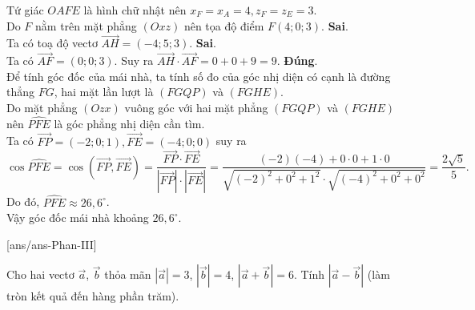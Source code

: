 \begin{ex}
{\begin{itemchoice}
Tứ giác $OAFE$ là hình chữ nhật nên $x_F=x_A=4, z_F=z_E=3$.\\
Do $F$ nằm trên mặt phẳng $(Oxz)$ nên tọa độ điểm $F(4; 0; 3)$.
 \itemch \textbf{Sai}.\\
Ta có toạ độ vectơ $\overrightarrow{AH}=(-4; 5; 3)$.
 \itemch \textbf{Sai}.\\
Ta có $\overrightarrow{AF}=(0; 0; 3)$. Suy ra $\overrightarrow{AH}\cdot\overrightarrow{AF}=0+0+9=9$.
 \itemch \textbf{Đúng}.\\
Để tính góc đốc của mái nhà, ta tính số đo của góc nhị diện có cạnh là đường thẳng $FG$, hai mặt lần lượt là $(FGQP)$ và $(FGHE)$.\\
Do mặt phẳng $(O z x)$ vuông góc với hai mặt phẳng $(FGQP)$ và $(F G H E)$ nên $\widehat{PFE}$ là góc phẳng nhị diện cần tìm.\\
Ta có $\overrightarrow{FP}=(-2; 0; 1), \overrightarrow{FE}=(-4; 0; 0)$ suy ra 
\[\cos\widehat{PFE}=\cos \left(\overrightarrow{FP}, \overrightarrow{FE}\right)=\dfrac{\overrightarrow{FP} \cdot \overrightarrow{FE}}{\left|\overrightarrow{FP}\right|\cdot\left|\overrightarrow{FE}\right|}= \dfrac{(-2)(-4)+0\cdot 0+1\cdot 0}{\sqrt{(-2)^2+0^2+1^2} \cdot \sqrt{(-4)^2+0^2+0^2}}=\dfrac{2 \sqrt{5}}{5}.\]
Do đó, $\widehat{PFE} \approx 26{,}6^{\circ}$.\\
Vậy góc đốc mái nhà khoảng $26{,}6^{\circ}$.
\end{itemchoice}
 }
\end{ex}

\caukq
{}[ans/ans\currfilebase-Phan-III]
\begin{ex}%
Cho hai vectơ $\overrightarrow{a}$, $\overrightarrow{b}$ thỏa mãn $\left|\overrightarrow{a}\right|=3$, $\left|\overrightarrow{b}\right|=4$, $\left|\overrightarrow{a}+\overrightarrow{b}\right|=6$. Tính $\left|\overrightarrow{a}-\overrightarrow{b}\right|$ (làm tròn kết quả đến hàng phần trăm).
\end{ex}

